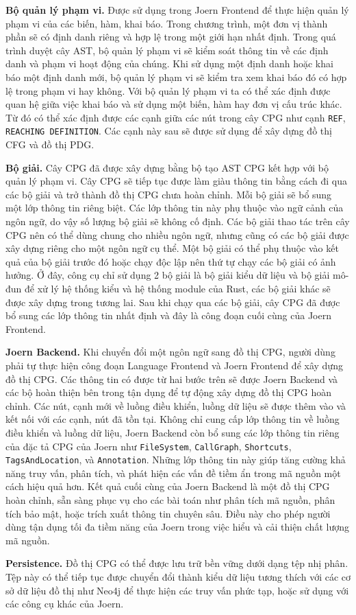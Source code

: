 \textbf{Bộ quản lý phạm vi.} Được sử dụng trong Joern Frontend để thực hiện quản lý phạm vi của các biến, hàm, khai báo.
Trong chương trình, một đơn vị thành phần sẽ có định danh riêng và hợp lệ trong một giới hạn nhất định.
Trong quá trình duyệt cây AST, bộ quản lý phạm vi sẽ kiểm soát thông tin về các định danh và phạm vi hoạt động của chúng.
Khi sử dụng một định danh hoặc khai báo một định danh mới, bộ quản lý phạm vi sẽ kiểm tra xem khai báo đó có hợp lệ trong phạm vi hay không.
Với bộ quản lý phạm vi ta có thể xác định được quan hệ giữa việc khai báo và sử dụng một biến, hàm hay đơn vị cấu trúc khác.
Từ đó có thể xác định được các cạnh giữa các nút trong cây CPG như cạnh \texttt{REF}, \texttt{REACHING DEFINITION}.
Các cạnh này sau sẽ được sử dụng để xây dựng đồ thị CFG và đồ thị PDG.

\textbf{Bộ giải.} Cây CPG đã được xây dựng bằng bộ tạo AST CPG kết hợp với bộ quản lý phạm vi.
Cây CPG sẽ tiếp tục được làm giàu thông tin bằng cách đi qua các bộ giải và trở thành đồ thị CPG chưa hoàn chỉnh.
Mỗi bộ giải sẽ bổ sung một lớp thông tin riêng biệt.
Các lớp thông tin này phụ thuộc vào ngữ cảnh của ngôn ngữ, do vậy số lượng bộ giải sẽ không cố định.
Các bộ giải thao tác trên cây CPG nên có thể dùng chung cho nhiều ngôn ngữ, nhưng cũng có các bộ giải được xây dựng riêng cho một ngôn ngữ cụ thể.
Một bộ giải có thể phụ thuộc vào kết quả của bộ giải trước đó hoặc chạy độc lập nên thứ tự chạy các bộ giải có ảnh hưởng.
Ở đây, công cụ chỉ sử dụng 2 bộ giải là bộ giải kiểu dữ liệu và bộ giải mô-đun để xử lý hệ thống kiểu và hệ thống module của Rust, các bộ giải khác sẽ được xây dựng trong tương lai.
Sau khi chạy qua các bộ giải, cây CPG đã được bổ sung các lớp thông tin nhất định và đây là công đoạn cuối cùng của Joern Frontend.

\textbf{Joern Backend.} Khi chuyển đổi một ngôn ngữ sang đồ thị CPG, người dùng phải tự thực hiện công đoạn Language Frontend và Joern Frontend để xây dựng đồ thị CPG.
Các thông tin có được từ hai bước trên sẽ được Joern Backend và các bộ hoàn thiện bên trong tận dụng để tự động xây dựng đồ thị CPG hoàn chỉnh.
Các nút, cạnh mới về luồng điều khiển, luồng dữ liệu sẽ được thêm vào và kết nối với các cạnh, nút đã tồn tại.
Không chỉ cung cấp lớp thông tin về luồng điều khiển và luồng dữ liệu, Joern Backend còn bổ sung các lớp thông tin riêng của đặc tả CPG của Joern như \texttt{FileSystem}, \texttt{CallGraph}, \texttt{Shortcuts}, \texttt{TagsAndLocation}, và \texttt{Annotation}.
Những lớp thông tin này giúp tăng cường khả năng truy vấn, phân tích, và phát hiện các vấn đề tiềm ẩn trong mã nguồn một cách hiệu quả hơn.
Kết quả cuối cùng của Joern Backend là một đồ thị CPG hoàn chỉnh, sẵn sàng phục vụ cho các bài toán như phân tích mã nguồn, phân tích bảo mật, hoặc trích xuất thông tin chuyên sâu.
Điều này cho phép người dùng tận dụng tối đa tiềm năng của Joern trong việc hiểu và cải thiện chất lượng mã nguồn.

\textbf{Persistence.} Đồ thị CPG có thể được lưu trữ bền vững dưới dạng tệp nhị phân.
Tệp này có thể tiếp tục được chuyển đổi thành kiểu dữ liệu tương thích với các cơ sở dữ liệu đồ thị như Neo4j để thực hiện các truy vấn phức tạp, hoặc sử dụng với các công cụ khác của Joern.
